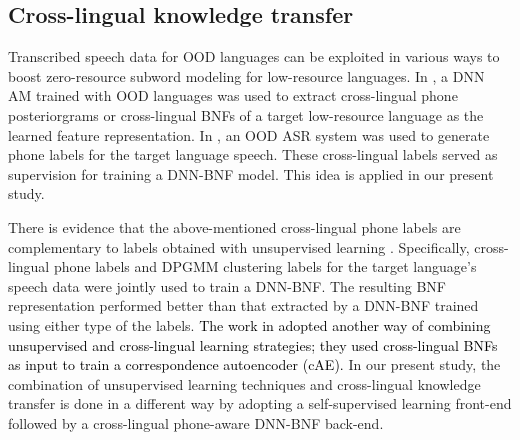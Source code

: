 \documentclass[transmag]{IEEEtran}
\begin{document}
\subsection{Cross-lingual knowledge transfer}
Transcribed speech data for OOD languages \cite{panayotov2015librispeech,aidatatang}
can be exploited in various ways to boost zero-resource subword modeling for low-resource languages. In \cite{shibata2017composite,feng2018exploiting}, a DNN AM trained with  OOD languages was used to extract cross-lingual phone posteriorgrams \cite{shibata2017composite} or cross-lingual BNFs \cite{shibata2017composite,feng2018exploiting} of a target low-resource language as the learned feature representation. 
In \cite{feng2018exploiting,feng2019_TASLP}, an OOD ASR system was used to generate phone labels for the target language speech. These cross-lingual labels served as supervision for training a DNN-BNF model. This idea is applied in our present study.

There is evidence that the above-mentioned cross-lingual phone labels are complementary to labels obtained with unsupervised learning    \cite{feng2018exploiting,feng2019_TASLP}.  Specifically, cross-lingual phone labels and DPGMM clustering labels for the target language’s speech data were jointly used to train a DNN-BNF.
The resulting BNF representation performed better than that extracted by a DNN-BNF trained using either type of the labels. 
\textcolor{black}{The work in \cite{hermann2021multilingual} adopted another way of combining unsupervised and cross-lingual learning strategies; they used cross-lingual BNFs as input to train a correspondence autoencoder (cAE).}
In our present study, the combination of unsupervised learning techniques and cross-lingual knowledge transfer is done in a different way by adopting a self-supervised learning front-end followed by a cross-lingual phone-aware DNN-BNF back-end. 
\end{document}
